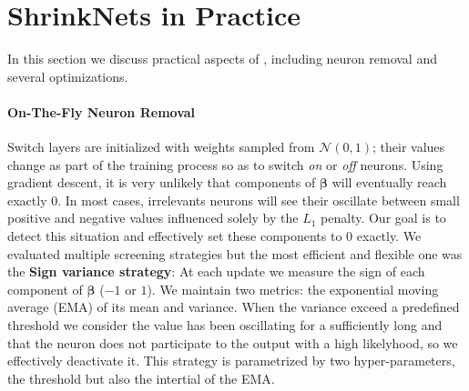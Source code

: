 
\section{ShrinkNets in Practice}

In this section we discuss practical aspects of \shrink{}, including 
neuron removal  and several optimizations.

\paragraph{On-The-Fly Neuron Removal}
\label{neuron_killing}

Switch layers are initialized with weights sampled from $\mathcal{N}(0,1)$;
their values change as part of the training process so as to switch \emph{on}
or \emph{off} neurons. Using gradient descent, it is very unlikely that
components of $\bm{\beta}$ will eventually reach exactly $0$. In most cases,
irrelevants neurons will see their \swl oscillate between small positive and
negative values influenced solely by the $L_1$ penalty. Our goal is
to detect this situation and effectively set these components to $0$ exactly. We
evaluated multiple screening strategies but the most efficient and flexible one
was the \textbf{Sign variance strategy}: At each update we measure the sign of
each component of $\bm{\beta}$ ($-1$ or $1$). We maintain two metrics: the
exponential moving average (EMA) of its mean and variance. When the variance exceed a
predefined threshold we consider the value has been oscillating for a
sufficiently long and that the neuron does not participate to the output with a
high likelyhood, so we effectively deactivate it. This strategy is parametrized
by two hyper-parameters, the threshold but also the intertial of the EMA.

% 
% 

